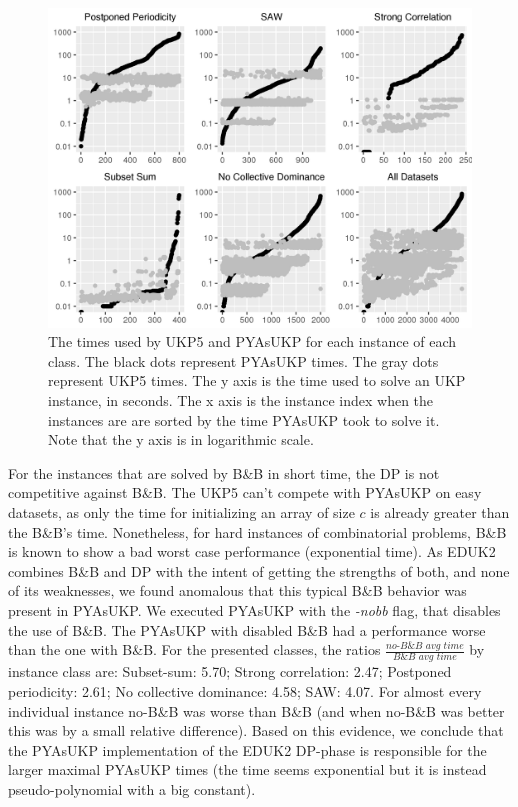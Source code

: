 \documentclass[runningheads,a4paper]{llncs}
\begin{document}
\begin{figure}[th]
  \label{fig:times}
  \centering
  \includegraphics[width=\textwidth]{six_plots.png}
  \caption{The times used by UKP5 and PYAsUKP for each instance of each class. The black dots represent PYAsUKP times. The gray dots represent UKP5 times. The y axis is the time used to solve an UKP instance, in seconds. The x axis is the instance index when the instances are are sorted by the time PYAsUKP took to solve it. Note that the y axis is in logarithmic scale.}
\end{figure}

For the instances that are solved by B\&B in short time, the DP is not competitive against B\&B. 
The UKP5 can't compete with PYAsUKP on easy datasets, as only the time for initializing an array of size \(c\) is already greater than the B\&B's time. 
Nonetheless, for hard instances of combinatorial problems, B\&B is known to show a bad worst case performance (exponential time). 
As EDUK2 combines B\&B and DP with the intent of getting the strengths of both, and none of its weaknesses, we found anomalous that this typical B\&B behavior was present in PYAsUKP. 
We executed PYAsUKP with the \emph{-nobb} flag, that disables the use of B\&B. 
The PYAsUKP with disabled B\&B had a performance worse than the one with B\&B. 
For the presented classes, the ratios \(\frac{\textit{no-B\&B~avg~time}}{\textit{B\&B~avg~time}}\) by instance class are: 
Subset-sum: 5.70; Strong correlation: 2.47; Postponed periodicity: 2.61; No collective dominance: 4.58; SAW: 4.07. 
For almost every individual instance no-B\&B was worse than B\&B (and when no-B\&B was better this was by a small relative difference). 
Based on this evidence, we conclude that the PYAsUKP implementation of the EDUK2 DP-phase is responsible for the larger maximal PYAsUKP times (the time seems exponential but it is instead pseudo-polynomial with a big constant).
\end{document}
